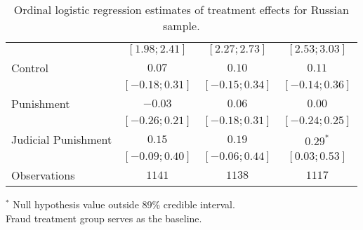 \begin{table}[h]
\begin{center}
\begin{threeparttable}
\begin{tabular}{l c c c}
                    & $ [ 1.98;  2.41]$ & $ [ 2.27;  2.73]$ & $ [ 2.53;  3.03]$ \\
Control             & $0.07$            & $0.10$            & $0.11$            \\
                    & $ [-0.18;  0.31]$ & $ [-0.15;  0.34]$ & $ [-0.14;  0.36]$ \\
Punishment          & $-0.03$           & $0.06$            & $0.00$            \\
                    & $ [-0.26;  0.21]$ & $ [-0.18;  0.31]$ & $ [-0.24;  0.25]$ \\
Judicial Punishment & $0.15$            & $0.19$            & $0.29^{*}$        \\
                    & $ [-0.09;  0.40]$ & $ [-0.06;  0.44]$ & $ [ 0.03;  0.53]$ \\
\hline
Observations        & $1141$            & $1138$            & $1117$            \\
\hline
\end{tabular}
\begin{tablenotes}[flushleft]
\scriptsize{$^*$ Null hypothesis value outside 89\% credible interval.  \\
Fraud treatment group serves as the baseline.}
\end{tablenotes}
\end{threeparttable}
\caption{Ordinal logistic regression estimates of treatment effects for Russian sample.}
\label{table:coefficients}
\end{center}
\end{table}
